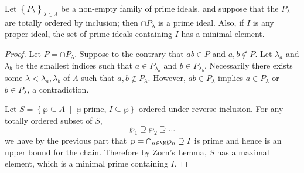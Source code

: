 \documentclass[10pt]{amsart}
\begin{document}
\begin{thm}
  Let $\left\{P_\lambda\right\}_{\lambda \in \Lambda}$ be a non-empty family of prime ideals, and suppose that the $P_\lambda$ are totally ordered by inclusion; then $\cap P_\lambda$ is a prime ideal.
  Also, if $I$ is any proper ideal, the set of prime ideals containing $I$ has a minimal element.

  \begin{proof}
    Let $P = \cap P_\lambda$.
    Suppose to the contrary that $ab \in P$ and $a, b \not \in P$.
    Let $\lambda_a$ and $\lambda_b$ be the smallest indices such that $a \in P_{\lambda_a}$ and $b \in P_{\lambda_b}$.
    Necessarily there exists some $\lambda < \lambda_a, \lambda_b$ of $\Lambda$ such that $a,b \not \in P_\lambda$.
    However, $ab \in P_\lambda$ implies $a \in P_\lambda$ or $b \in P_\lambda$, a contradiction.
    
    Let $S = \left\{\wp \subseteq A \;\middle\vert\; \wp\ \text{prime},\, I \subseteq \wp\right\}$ ordered under reverse inclusion.
    For any totally ordered subset of $S$,
    $$\wp_1 \supseteq \wp_2 \supseteq \ldots$$
    we have by the previous part that $\wp = \cap_{n \in \N}{\wp_n} \supseteq I$ is prime and hence is an upper bound for the chain.
    Therefore by Zorn's Lemma, $S$ has a maximal element, which is a minimal prime containing $I$.
  \end{proof}
\end{thm}
\end{document}
